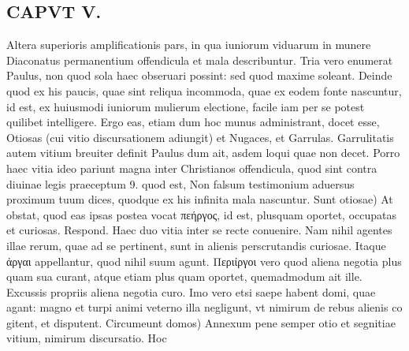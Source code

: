 \documentclass{article}
\begin{document}
\begin{pages}
\section*{CAPVT  V. }
\marginpar{[ p.285 ]}\pstart Altera superioris amplificationis pars, in qua iuniorum viduarum in munere Diaconatus permanentium offendicula et mala describuntur. Tria vero enumerat Paulus, non quod sola haec obseruari possint: sed quod maxime soleant. Deinde quod ex his paucis, quae sint reliqua incommoda, quae ex eodem fonte nascuntur, id est, ex huiusmodi iuniorum mulierum electione, facile iam per se potest quilibet intelligere. Ergo eas, etiam dum hoc munus administrant, docet esse, Otiosas (cui vitio discursationem adiungit) et Nugaces, et Garrulas. Garrulitatis autem vitium breuiter definit Paulus dum ait, asdem loqui quae non decet. Porro haec vitia ideo pariunt magna inter Christianos offendicula, quod sint contra diuinae legis praeceptum 9. quod est, Non falsum testimonium aduersus proximum tuum dices, quodque ex his infinita mala nascuntur. Sunt otiosae) At obstat, quod eas ipsas postea vocat πεήργος, id est, plusquam oportet, occupatas et curiosas. Respond. Haec duo vitia inter se recte conuenire. Nam nihil agentes illae rerum, quae ad se pertinent, sunt in alienis perscrutandis curiosae. Itaque ἀργαι appellantur, quod nihil suum agunt. Περιίργοι vero quod aliena negotia plus quam sua curant, atque etiam plus quam oportet, quemadmodum ait ille. Excussis propriis aliena negotia curo. Imo vero etsi saepe habent domi, quae agant: magno et turpi animi veterno illa negligunt, vt nimirum de rebus alienis co gitent, et disputent. Circumeunt domos) Annexum pene semper otio et segnitiae vitium, nimirum discursatio. Hoc  \pend

\end{pages}
\end{document}

